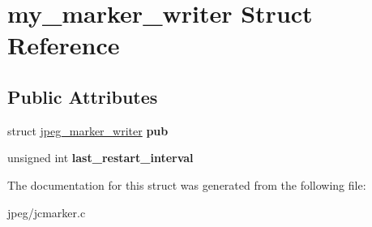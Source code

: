 \hypertarget{structmy__marker__writer}{}\section{my\+\_\+marker\+\_\+writer Struct Reference}
\label{structmy__marker__writer}
\subsection*{Public Attributes}
\begin{DoxyCompactItemize}
\item 
struct \hyperlink{structjpeg__marker__writer}{jpeg\+\_\+marker\+\_\+writer} {\bfseries pub}\hypertarget{structmy__marker__writer_a4b02f71e32586520f4498e51a79b1fca}{}\label{structmy__marker__writer_a4b02f71e32586520f4498e51a79b1fca}

\item 
unsigned int {\bfseries last\+\_\+restart\+\_\+interval}\hypertarget{structmy__marker__writer_a772bc536da8c387a460a529c3d8145e4}{}\label{structmy__marker__writer_a772bc536da8c387a460a529c3d8145e4}

\end{DoxyCompactItemize}


The documentation for this struct was generated from the following file\+:\begin{DoxyCompactItemize}
\item 
jpeg/jcmarker.\+c\end{DoxyCompactItemize}
